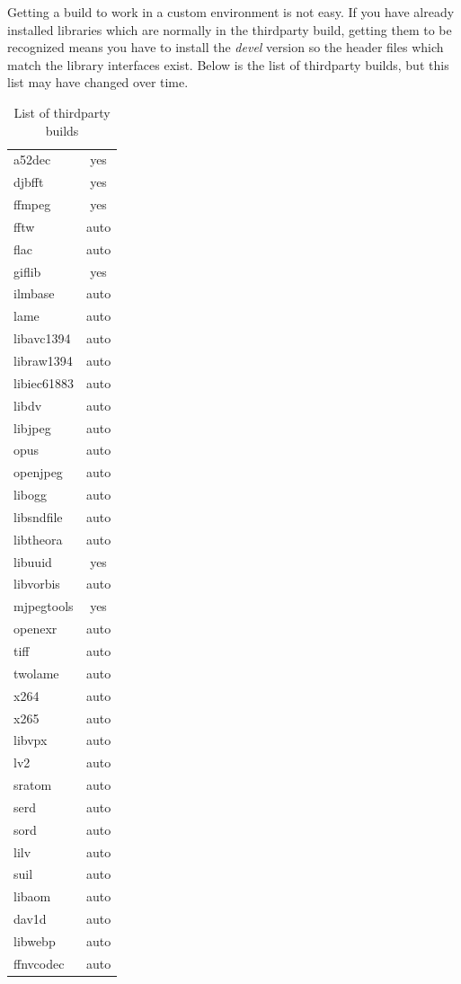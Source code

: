 Getting a build to work in a custom environment is not easy.  If you have already installed libraries which are normally in the thirdparty build, getting them to be recognized means you have to install the \textit{devel} version so the header files which match the library interfaces exist.  Below is the list of thirdparty builds, but this list may have changed over time.

\begin{table}[htpb]
    \centering
    \caption{List of thirdparty builds}
    \label{tab:List_of_thirdparty_builds}
        \small
    \begin{tabular}{m{8em}c}
        \toprule
 	a52dec   & yes\\
 	djbfft   & yes\\
 	ffmpeg   & yes\\
 	fftw     & auto\\
 	flac     & auto\\
 	giflib   & yes\\
 	ilmbase	 & auto\\
 	lame     & auto\\
 	libavc1394&auto\\
 	libraw1394&auto\\
 	libiec61883&auto\\
	libdv     &auto\\
 	libjpeg   &auto\\
 	opus	  &auto\\
 	openjpeg  &auto\\
 	libogg    &auto\\
 	libsndfile&auto\\
 	libtheora&auto\\
 	libuuid  & yes\\
 	libvorbis&auto\\
 	mjpegtools&yes\\
 	openexr   &auto\\
	tiff      &auto\\
 	twolame   &auto\\
 	x264      &auto\\
 	x265      &auto\\
 	libvpx    &auto\\
 	lv2       &auto\\
 	sratom    &auto\\
 	serd      &auto\\
 	sord      &auto\\
 	lilv      &auto\\
 	suil      &auto\\
 	libaom    &auto\\
 	dav1d     &auto\\
	libwebp   &auto\\
 	ffnvcodec &auto\\
    \bottomrule
    \end{tabular}
\end{table}


